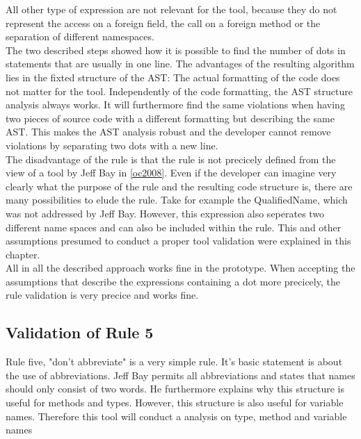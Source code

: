 All other type of expression are not relevant for the tool, because they do not represent the access on a foreign field, the call on a foreign method or the separation of different namespaces.
\\

The two described steps showed how it is possible to find the number of dots in statements that are usually in one line.
The advantages of the resulting algorithm lies in the fixted structure of the \acf{AST}: The actual formatting of the code does not matter for the tool. Independently of the code formatting, the \acf{AST} structure analysis always works. It will furthermore find the same violations when having two pieces of source code with a different formatting but describing the same \acf{AST}. This makes the \acf{AST} analysis robust and the developer cannot remove violations by separating two dots with a new line.
\\

The disadvantage of the rule is that the rule is not precicely defined from the view of a tool by Jeff Bay in \ref{oc2008}. Even if the developer can imagine very clearly what the purpose of the rule and the resulting code structure is, there are many possibilities to elude the rule. Take for example the QualifiedName, which was not addressed by Jeff Bay. However, this expression also seperates two different name spaces and can also be included within the rule. This and other assumptions presumed to conduct a proper tool validation were explained in this chapter. 
\\

All in all the described approach works fine in the prototype. When accepting the assumptions that describe the expressions containing a dot more precicely, the rule validation is very precice and works fine.
\\

\subsection*{Validation of Rule 5}
Rule five, "don't abbreviate" is a very simple rule. It's basic statement is about the use of abbreviations.
Jeff Bay permits all abbreviations and states that names should only consist of two words. He furthermore explains why this structure is useful for methods and types. However, this structure is also useful for variable names. Therefore this tool will conduct a analysis on type, method and variable names
\\

